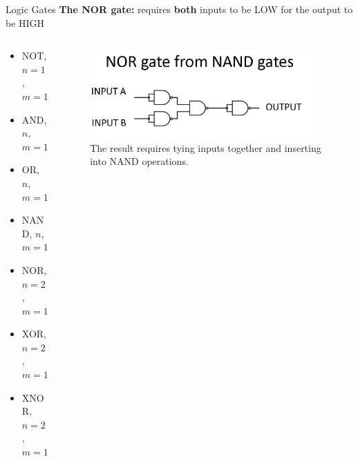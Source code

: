 \documentclass{beamer}
\begin{document}
\begin{frame}{Logic Gates}
\textbf{The NOR gate:} requires \textbf{both} inputs to be LOW for the output to be HIGH \\ \vspace{0.5cm}
\begin{columns}[T]
\begin{column}{0.5\textwidth}
\begin{itemize}
\item \alert{NOT, $n=1$, $m=1$}
\item \alert{AND, $n$, $m=1$}
\item \alert{OR, $n$, $m=1$}
\item \alert{NAND, $n$, $m=1$}
\item \alert{NOR, $n=2$, $m=1$}
\item XOR, $n=2$, $m=1$
\item XNOR, $n=2$, $m=1$
\end{itemize}
\end{column}
\begin{column}{0.5\textwidth}
\begin{figure}
\centering
\includegraphics[width=0.95\textwidth]{figures/NORfromNAND.jpg}
\caption{\label{fig:nor3} The result requires tying inputs together and inserting into NAND operations.}
\end{figure}
\end{column}
\end{columns}
\end{frame}
\end{document}
